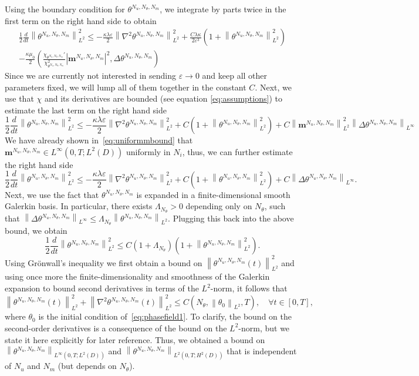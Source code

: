 \documentclass[10pt,letterpaper,twoside]{amsart}
\theoremstyle{definition}{\newtheorem{definition}[lemma]{Definition}}
\theoremstyle{note}{\newtheorem{claim}{Claim}[section]
\newtheorem*{claim*}{Claim}}
\numberwithin{equation}{section}
\newcommand{\dom}{D}
\newcommand{\norm}[1]{\left\| #1 \right\|}
\newcommand{\Grad}{\nabla}
\newcommand{\bma}{\mathbf{m}^{N_u,N_\theta,N_m}}
\newcommand{\tha}{\theta^{N_u,N_\theta,N_m}}
\begin{document}
Using the boundary condition for $\tha$, we integrate by parts twice in the first term on the right hand side to obtain
\begin{multline*}
	\frac12\frac{d}{dt}\norm{\tha}_{L^2}^2\leq  -\frac{\kappa\lambda \varepsilon}{2}\norm{\Grad^2\tha}_{L^2}^2+  \frac{C\lambda\kappa}{2\varepsilon^3}(1+\norm{\tha}_{L^2}^2 )\\
	- \frac{\kappa\mu_0}{2}\left(\frac{\chi_{\tha}'}{\chi_{\tha}^2} |\bma|^2,\Delta\tha\right)
\end{multline*}
Since we are currently not interested in sending $\varepsilon \to 0$ and keep all other parameters fixed, we will lump all of them together in the constant $C$. Next, we use that $\chi$ and its derivatives are bounded 
(see equation \eqref{eq:assumptions}) to estimate the last term on the right hand side
\begin{equation*}
	\frac12\frac{d}{dt}\norm{\tha}_{L^2}^2\leq  -\frac{\kappa\lambda \varepsilon}{2}\norm{\Grad^2\tha}_{L^2}^2+  C(1+\norm{\tha}_{L^2}^2 )+ C \norm{\bma}_{L^2}^2\norm{\Delta\tha}_{L^\infty}
\end{equation*}
We have already shown in~\eqref{eq:uniformmbound} that $\bma\in L^\infty(0,T;L^2(\dom))$ uniformly in $N_i$, thus, we can further estimate the right hand side
\begin{equation*}
	\frac12\frac{d}{dt}\norm{\tha}_{L^2}^2\leq  -\frac{\kappa\lambda \varepsilon}{2}\norm{\Grad^2\tha}_{L^2}^2+  C(1+\norm{\tha}_{L^2}^2 )+ C \norm{\Delta\tha}_{L^\infty}.
\end{equation*}
Next, we use the fact that $\tha$ is expanded in a finite-dimensional smooth Galerkin basis. In particular, there exists $\Lambda_{N_\theta}>0$ depending only on $N_\theta$, such that $\norm{\Delta\tha}_{L^\infty} \le \Lambda_{N_\theta} \norm{\tha}_{L^2}$. Plugging this back into the above bound, we obtain
\begin{equation*}
	\frac12\frac{d}{dt}\norm{\tha}_{L^2}^2  \leq C (1+\Lambda_{N_\theta}) (1+\norm{\tha}_{L^2}^2 ).
\end{equation*}
Using Gr\"onwall's inequality we first obtain a bound on $\norm{\tha(t)}_{L^2}^2$ and using once more the finite-dimensionality and smoothness of the Galerkin expansion to bound second derivatives in terms of the $L^2$-norm, it follows that 
\begin{equation}
	\label{eq:almostuniformphibound}
	\norm{\tha(t)}_{L^2}^2+\norm{\Grad^2\tha(t)}^2_{L^2}
    \leq C({N_\theta},\norm{\theta_0}_{L^2},T), \quad \forall t\in [0,T],
\end{equation}
where $\theta_0$ is the initial condition of~\eqref{eq:phasefield1}. To clarify, the bound on the second-order derivatives is a consequence of the bound on the $L^2$-norm, but we state it here explicitly for later reference.
Thus, we obtained a bound on $\norm{\tha}_{L^\infty(0,T;L^2(\dom))}$ and $\norm{\tha}_{L^2(0,T;H^2(\dom))}$ that is independent of $N_u$ and $N_m$ (but depends on $N_\theta$).
\end{document}
